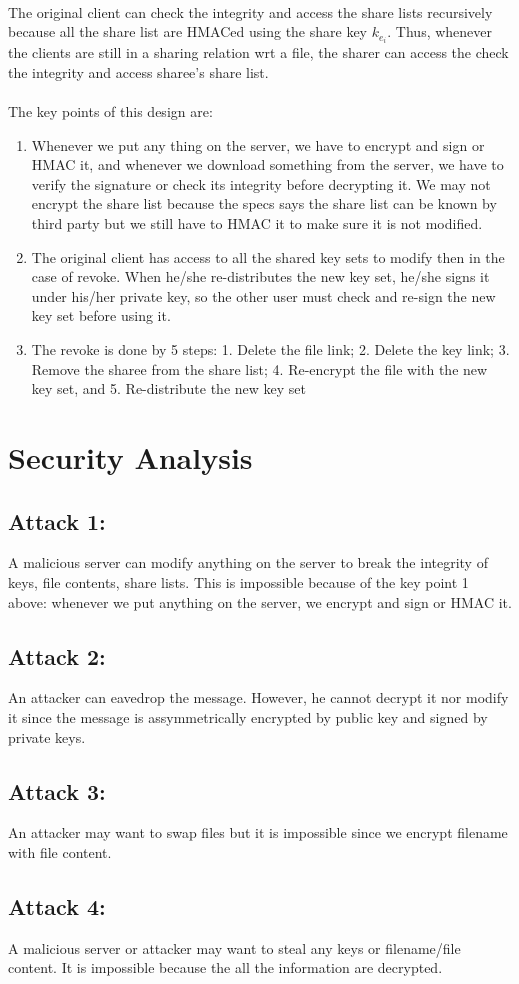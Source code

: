 \documentclass[a4paper, 11pt]{article}
\begin{document}
\\
The original client can check the integrity and access the share lists recursively because all the share list are HMACed using the share key $k_{e_i}$. Thus, whenever the clients are still in a sharing relation wrt a file, the sharer can access the check the integrity and access sharee's share list.\\
\\
The key points of this design are:
%
\begin{enumerate}
	\item Whenever we put any thing on the server, we have to encrypt and sign or HMAC it, and whenever we download something from the server, we have to verify the signature or check its integrity before decrypting it. We may not encrypt the share list because the specs says the share list can be known by third party but we still have to HMAC it to make sure it is not modified.
	\item The original client has access to all the shared key sets to modify then in the case of revoke. When he/she re-distributes the new key set, he/she signs it under his/her private key, so the other user must check and re-sign the new key set before using it.
	\item The revoke is done by 5 steps: 1. Delete the file link; 2. Delete the key link; 3. Remove the sharee from the share list; 4. Re-encrypt the file with the new key set, and 5. Re-distribute the new key set
\end{enumerate}

\section*{Security Analysis}
\subsection*{Attack 1:}
A malicious server can modify anything on the server to break the integrity of keys, file contents, share lists. This is impossible because of the key point 1 above: whenever we put anything on the server, we encrypt and sign or HMAC it.

\subsection*{Attack 2:}
An attacker can eavedrop the message. However, he cannot decrypt it nor modify it since the message is assymmetrically encrypted by public key and signed by private keys.

\subsection*{Attack 3:}
An attacker may want to swap files but it is impossible since we encrypt filename with file content.

\subsection*{Attack 4:}
A malicious server or attacker may want to steal any keys or filename/file content. It is impossible because the all the information are decrypted.
\end{document}
